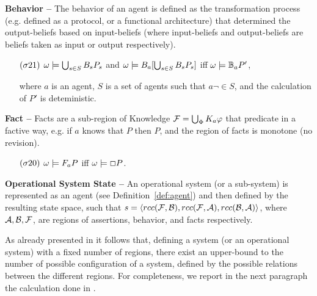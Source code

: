 \begin{definition}{\bf Behavior -- }\label{def:behavior}
	The behavior of an agent is defined as the transformation process (e.g. defined as a
	protocol, or a functional architecture) that determined the
	output-beliefs based on input-beliefs (where input-beliefs and
	output-beliefs are beliefs taken as input or output respectively).
	\begin{enumerate}[noitemsep]
		\item[$(\sigma21)$] $\omega\models\bigcup_{s\in S}B_{s}P_{s}$ and $\omega\models B_{a}[\bigcup_{s\in S}B_{s}P_{s}]$ iff
			$\omega\models\mathbb{B}_{a}{P'}$, 
			
		where $a$ is an agent, $S$ is a set of agents such that $a\neg\in S$, and the calculation of $P'$ is deteministic.
	\end{enumerate}
\end{definition}

\begin{definition}{\bf Fact -- }\label{def:fact}
Facts are a sub-region of Knowledge $\mathcal{F} = \bigcup_\Phi K_{a}\varphi$
	that predicate in a factive way, e.g.
	if $a$ knows that $P$ then $P$, and the region of facts is monotone (no revision).
	\begin{enumerate}[noitemsep]
		\item[$(\sigma20)$] $\omega\models F_{a}P$ iff
			$\omega \models \Box P$. 
	\end{enumerate}
\end{definition}

\begin{definition}{\bf Operational System State --}\label{def:system}
	An operational system (or a sub-system) is represented as an agent (see Definition~\ref{def:agent}) and then defined by the resulting state space,
	such that
	$s=\langle rcc(\mathcal{F},\mathcal{B}),rcc(\mathcal{F},\mathcal{A}),rcc(\mathcal{B},\mathcal{A})\rangle$,
	where $\mathcal{A},\mathcal{B},\mathcal{F}$, are regions of assertions, behavior, and facts respectively.
\end{definition}

As already presented in \autocite{Santaca2016abf} it follows that, defining
a system (or an operational system) with a fixed number of regions, there exist
an upper-bound to the number of possible configuration of a system, defined by
the possible relations between the different regions.
For completeness, we report in the next paragraph 
the calculation done in \autocite{Santaca2016abf}.

